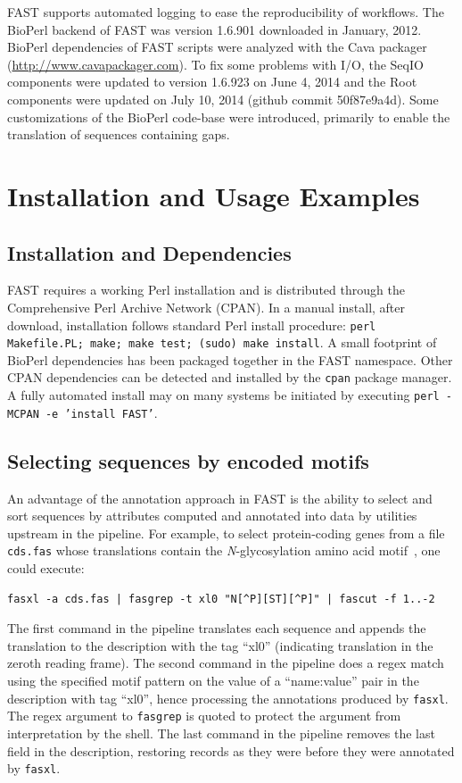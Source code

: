 \documentclass{frontiersSCNS} %
\begin{document}
FAST supports automated logging to ease the reproducibility of
workflows. The BioPerl backend of FAST was version 1.6.901 downloaded in January,
2012. BioPerl dependencies of FAST scripts were analyzed with the Cava
packager (\url{http://www.cavapackager.com}). To fix some problems with
I/O, the SeqIO components were updated to version 1.6.923 on
June 4, 2014 and the Root components were updated on July 10, 2014 (github commit 50f87e9a4d). 
Some customizations of the BioPerl code-base were introduced, primarily 
to enable the translation of sequences containing gaps. 

\section{Installation and Usage Examples}

\subsection{Installation and Dependencies}
FAST requires a working Perl installation and is distributed through
the Comprehensive Perl Archive Network (CPAN). In a manual install,
after download, installation follows standard Perl install procedure:
{\tt perl Makefile.PL; make; make test; (sudo) make install}. A small
footprint of BioPerl dependencies has been packaged together in the
FAST namespace. Other CPAN dependencies can be detected and installed
by the {\tt cpan} package manager. A fully automated install may on
many systems be initiated by executing {\tt perl -MCPAN -e 'install
  FAST'}.

\subsection{Selecting sequences by encoded motifs }

An advantage of the annotation approach in FAST is the ability to
select and sort sequences by attributes computed and annotated into
data by utilities upstream in the pipeline. For example, to select
protein-coding genes from a file {\tt cds.fas} whose translations
contain the {\it N}-glycosylation amino acid
motif~\cite{KornfieldKornfield85}, one could execute:

\begin{verbatim}
fasxl -a cds.fas | fasgrep -t xl0 "N[^P][ST][^P]" | fascut -f 1..-2
\end{verbatim}
 
The first command in the pipeline translates each sequence and appends
the translation to the description with the tag ``xl0'' (indicating
translation in the zeroth reading frame). The second command in the
pipeline does a regex match using the specified motif pattern on the
value of a ``name:value'' pair in the description with tag ``xl0'',
hence processing the annotations produced by {\tt fasxl}. The regex
argument to {\tt fasgrep} is quoted to protect the argument from
interpretation by the shell. The last command in the pipeline removes
the last field in the description, restoring records as they were
before they were annotated by {\tt fasxl}.
\end{document}

